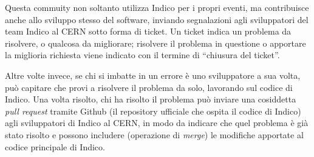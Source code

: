 		Questa commuity non soltanto utilizza Indico per i propri eventi, ma contribuisce anche allo sviluppo stesso del software,  inviando segnalazioni agli sviluppatori del team Indico  al \ac{CERN} sotto forma di ticket. Un ticket indica un problema da risolvere, o qualcosa da migliorare; risolvere il problema in questione o apportare la miglioria richiesta viene indicato con il termine di ``chiusura del ticket''.
		
		Altre volte invece, se chi si imbatte in un errore è uno sviluppatore a sua volta, può capitare che provi a risolvere il problema da solo, lavorando sul codice di Indico. Una volta  risolto, chi ha risolto il problema può inviare una cosiddetta \textit{pull request} tramite Github (il repository ufficiale che ospita il codice di Indico) agli sviluppatori di Indico al \ac{CERN}, in modo da indicare che  quel  problema è già stato risolto e possono includere (operazione di \textit{merge}) le modifiche apportate al codice principale di Indico.
	